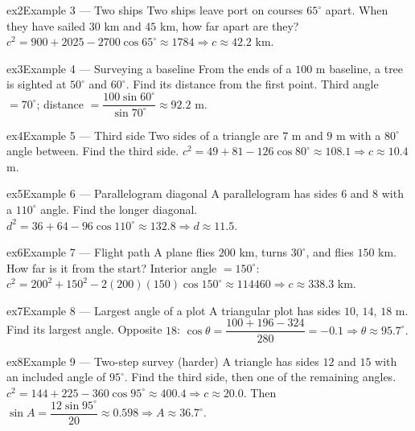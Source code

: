 \documentclass[11pt]{article}
\begin{document}
\begin{example}{ex2}{Example 3 --- Two ships}
Two ships leave port on courses $65^\circ$ apart. When they have sailed $30$ km and $45$ km, how far apart are they?
\soln $c^2=900+2025-2700\cos65^\circ\approx1784\Rightarrow c\approx42.2$ km.
\end{example}

\begin{example}{ex3}{Example 4 --- Surveying a baseline}
From the ends of a $100$ m baseline, a tree is sighted at $50^\circ$ and $60^\circ$. Find its distance from the first point.
\soln Third angle $=70^\circ$; distance $=\dfrac{100\sin60^\circ}{\sin70^\circ}\approx92.2$ m.
\end{example}

\begin{example}{ex4}{Example 5 --- Third side}
Two sides of a triangle are $7$ m and $9$ m with a $80^\circ$ angle between. Find the third side.
\soln $c^2=49+81-126\cos80^\circ\approx108.1\Rightarrow c\approx10.4$ m.
\end{example}

\begin{example}{ex5}{Example 6 --- Parallelogram diagonal}
A parallelogram has sides $6$ and $8$ with a $110^\circ$ angle. Find the longer diagonal.
\soln $d^2=36+64-96\cos110^\circ\approx132.8\Rightarrow d\approx11.5.$
\end{example}

\begin{example}{ex6}{Example 7 --- Flight path}
A plane flies $200$ km, turns $30^\circ$, and flies $150$ km. How far is it from the start?
\soln Interior angle $=150^\circ$: $c^2=200^2+150^2-2(200)(150)\cos150^\circ\approx114460\Rightarrow c\approx338.3$ km.
\end{example}

\begin{example}{ex7}{Example 8 --- Largest angle of a plot}
A triangular plot has sides $10$, $14$, $18$ m. Find its largest angle.
\soln Opposite $18$: $\cos\theta=\dfrac{100+196-324}{280}=-0.1\Rightarrow\theta\approx95.7^\circ.$
\end{example}

\begin{example}{ex8}{Example 9 --- Two-step survey (harder)}
A triangle has sides $12$ and $15$ with an included angle of $95^\circ$. Find the third side, then one of the remaining angles.
\soln $c^2=144+225-360\cos95^\circ\approx400.4\Rightarrow c\approx20.0$. Then $\sin A=\dfrac{12\sin95^\circ}{20}\approx0.598\Rightarrow A\approx36.7^\circ.$
\end{example}
\end{document}
